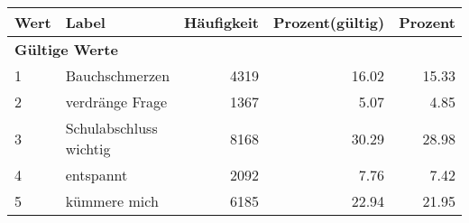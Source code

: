      \begin{longtable}{lXrrr}
     \toprule
     \textbf{Wert} & \textbf{Label} & \textbf{Häufigkeit} & \textbf{Prozent(gültig)} & \textbf{Prozent} \\
     \endhead
     \midrule
     \multicolumn{5}{l}{\textbf{Gültige Werte}}\\

     1 &
     \multicolumn{1}{X}{ Bauchschmerzen   } &


       \num{4319} &
       \num[round-mode=places,round-precision=2]{16,02} &
         \num[round-mode=places,round-precision=2]{15,33} \\

     2 &
     \multicolumn{1}{X}{ verdränge Frage   } &


       \num{1367} &
       \num[round-mode=places,round-precision=2]{5,07} &
         \num[round-mode=places,round-precision=2]{4,85} \\

     3 &
     \multicolumn{1}{X}{ Schulabschluss wichtig   } &


       \num{8168} &
       \num[round-mode=places,round-precision=2]{30,29} &
         \num[round-mode=places,round-precision=2]{28,98} \\

     4 &
     \multicolumn{1}{X}{ entspannt   } &


       \num{2092} &
       \num[round-mode=places,round-precision=2]{7,76} &
         \num[round-mode=places,round-precision=2]{7,42} \\

     5 &
     \multicolumn{1}{X}{ kümmere mich   } &


       \num{6185} &
       \num[round-mode=places,round-precision=2]{22,94} &
         \num[round-mode=places,round-precision=2]{21,95} \\


\end{longtable}

